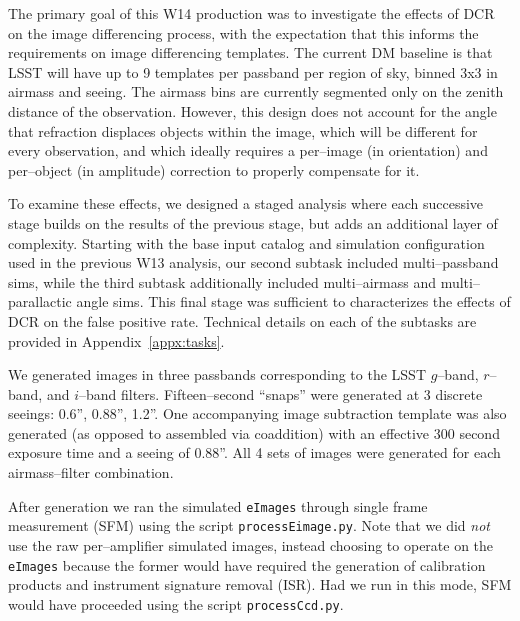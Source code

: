 \documentclass[prd, nofootinbib, floatfix, 11pt, tightenlines, times]{article}
\begin{document}
The primary goal of this W14 production was to investigate the effects
of DCR on the image differencing process, with the expectation that
this informs the requirements on image differencing templates.  The
current DM baseline is that LSST will have up to 9 templates per
passband per region of sky, binned 3x3 in airmass and seeing.  The
airmass bins are currently segmented only on the zenith distance of
the observation.  However, this design does not account for the angle
that refraction displaces objects within the image, which will be
different for every observation, and which ideally requires a
per--image (in orientation) and per--object (in amplitude) correction
to properly compensate for it.

To examine these effects, we designed a staged analysis where each
successive stage builds on the results of the previous stage, but adds
an additional layer of complexity.  Starting with the base input
catalog and simulation configuration used in the previous W13
analysis, our second subtask included multi--passband sims, while the
third subtask additionally included multi--airmass and
multi--parallactic angle sims.  This final stage was sufficient to
characterizes the effects of DCR on the false positive rate.
Technical details on each of the subtasks are provided in
Appendix~\ref{appx:tasks}.

We generated images in three passbands corresponding to the LSST
$g$--band, $r$--band, and $i$--band filters.  Fifteen--second
``snaps'' were generated at 3 discrete seeings: 0.6'', 0.88'', 1.2''.
One accompanying image subtraction template was also generated (as
opposed to assembled via coaddition) with an effective 300 second
exposure time and a seeing of 0.88''.  All 4 sets of images were
generated for each airmass--filter combination.

After generation we ran the simulated {\tt eImages} through single
frame measurement (SFM) using the script {\tt processEimage.py}.  Note
that we did {\it not} use the raw per--amplifier simulated images,
instead choosing to operate on the {\tt eImages} because the former
would have required the generation of calibration products and
instrument signature removal (ISR).  Had we run in this mode, SFM
would have proceeded using the script {\tt processCcd.py}.
\end{document}

